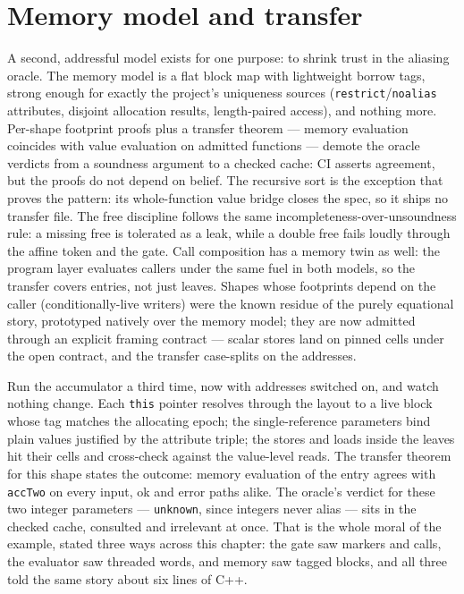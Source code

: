 \section{Memory model and transfer}

A second, addressful model exists for one purpose: to shrink trust in
the aliasing oracle. The memory model is a flat block map with
lightweight borrow tags, strong enough for exactly the project's
uniqueness sources (\texttt{restrict}/\texttt{noalias} attributes,
disjoint allocation results, length-paired access), and nothing more.
Per-shape footprint proofs plus a transfer theorem --- memory evaluation
coincides with value evaluation on admitted functions --- demote the
oracle verdicts from a soundness argument to a checked cache: CI asserts
agreement, but the proofs do not depend on belief. The recursive sort
is the exception that proves the pattern: its whole-function value
bridge closes the spec, so it ships no transfer file. The free
discipline follows the same incompleteness-over-unsoundness rule: a missing free
is tolerated as a leak, while a double free fails loudly through the
affine token and the gate. Call composition has a memory twin as well:
the program layer evaluates callers under the same fuel in both models,
so the transfer covers entries, not just leaves. Shapes whose
footprints depend on the caller (conditionally-live writers) were the
known residue of the purely equational story, prototyped natively over
the memory model; they are now admitted through an explicit framing
contract --- scalar stores land on pinned cells under the open contract,
and the transfer case-splits on the addresses.

Run the accumulator a third time, now with addresses switched on, and
watch nothing change. Each \texttt{this} pointer resolves through the
layout to a live block whose tag matches the allocating epoch; the
single-reference parameters bind plain values justified by the
attribute triple; the stores and loads inside the leaves hit their
cells and cross-check against the value-level reads. The transfer
theorem for this shape states the outcome: memory evaluation of the
entry agrees with \texttt{accTwo} on every input, ok and error paths
alike. The oracle's verdict for these two integer parameters ---
\texttt{unknown}, since integers never alias --- sits in the checked
cache, consulted and irrelevant at once. That is the whole moral of
the example, stated three ways across this chapter: the gate saw
markers and calls, the evaluator saw threaded words, and memory saw
tagged blocks, and all three told the same story about six lines of
C++.
